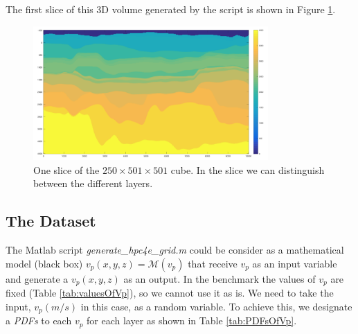 The first slice of this 3D volume generated by the script is shown in Figure \ref{fig:slice1}.

\begin{figure}[H]
    \centering
    \includegraphics[width=0.8\textwidth]{images/velocity_field.png}
    \caption{One slice of the $250\times501\times501$ cube. In the slice we can distinguish between the different layers.}
    \label{fig:slice1}
\end{figure}

\subsection{The Dataset}
The Matlab script \textit{generate\_hpc4e\_grid.m} could be consider as a mathematical model (black box) $v_{p}(x,y,z) = \mathcal{M}(v_{p})$ that receive $v_{p}$ as an input variable and generate a $v_{p}(x,y,z)$ as an output. In the benchmark the values of $v_{p}$ are fixed (Table \ref{tab:valuesOfVp}), so we cannot use it as is. We need to take the input, $v_{p}(m/s)$  in this case, as a random variable. To achieve this, we designate a \textit{PDFs} to each $v_{p}$ for each layer as shown in Table \ref{tab:PDFsOfVp}.

